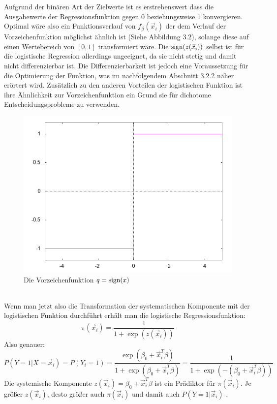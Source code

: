 Aufgrund der binären Art der Zielwerte ist es erstrebenswert dass die Ausgabewerte der Regressionsfunktion gegen 0 beziehungsweise 1 konvergieren. Optimal wäre also ein Funktionsverlauf von $f_\beta(\vec x_i)$ der dem Verlauf der Vorzeichenfunktion möglichst ähnlich ist (Siehe Abbildung 3.2), solange diese auf einen Wertebereich von $[0,1]$ transformiert wäre. Die $\operatorname{sign}(z(\vec x_i))$ selbst ist für die logistische Regression allerdings ungeeignet, da sie nicht stetig und damit nicht differenzierbar ist. Die Differenzierbarkeit ist jedoch eine Voraussetzung für die Optimierung der Funktion, was im nachfolgendem Abschnitt 3.2.2 näher erörtert wird.
Zusätzlich zu den anderen Vorteilen der logistischen Funktion ist ihre Ähnlichkeit zur Vorzeichenfunktion ein Grund sie für dichotome Entscheidungsprobleme zu verwenden.
\begin{figure}[ht]
\centering
\includegraphics[scale=0.75]{bilder/sign}
\caption{Die Vorzeichenfunktion $q=\operatorname{sign}(x)$ }
\end{figure}\\
Wenn man jetzt also die Transformation der systematischen Komponente mit der logistischen Funktion durchführt erhält man die logistische Regressionsfunktion:
\begin{displaymath}
\pi(\vec x_i)= \dfrac{1}{1+\exp(z(\vec x_i))}
\end{displaymath}
Also genauer:
\begin{displaymath}
P(Y=1 | X=\vec x_i)=P(Y_i=1)=\frac{\exp(\beta_0+\vec x_i^T\beta)}{1+\exp(\beta_0+\vec x_i^T\beta)} = \frac{1}{1+\exp(-(\beta_0+\vec x_i^T\beta))}
\end{displaymath}
Die systemische Komponente $z(\vec x_i)=\beta_0 + \vec x_i^T\beta$ ist ein Prädiktor für $\pi(\vec x_i)$. Je größer $z(\vec x_i)$, desto größer auch $\pi(\vec x_i)$ und damit auch $P(Y=1|\vec x_i)$ \cite{BECK}.\newpage
